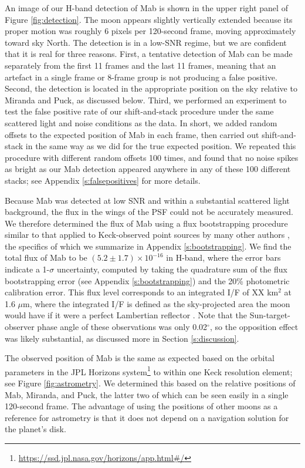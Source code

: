 \documentclass[preprint]{aastex631}
\begin{document}
An image of our H-band detection of Mab is shown in the upper right panel of Figure \ref{fig:detection}. The moon appears slightly vertically extended because its proper motion was roughly 6 pixels per 120-second frame, moving approximately toward sky North. The detection is in a low-SNR regime, but we are confident that it is real for three reasons. First, a tentative detection of Mab can be made separately from the first 11 frames and the last 11 frames, meaning that an artefact in a single frame or 8-frame group is not producing a false positive. Second, the detection is located in the appropriate position on the sky relative to Miranda and Puck, as discussed below. Third, we performed an experiment to test the false positive rate of our shift-and-stack procedure under the same scattered light and noise conditions as the data. In short, we added random offsets to the expected position of Mab in each frame, then carried out shift-and-stack in the same way as we did for the true expected position. We repeated this procedure with different random offsets 100 times, and found that no noise spikes as bright as our Mab detection appeared anywhere in any of these 100 different stacks; see Appendix \ref{s:falsepositives} for more details.

Because Mab was detected at low SNR and within a substantial scattered light background, the flux in the wings of the PSF could not be accurately measured. We therefore determined the flux of Mab using a flux bootstrapping procedure similar to that applied to Keck-observed point sources by many other authors \citep[e.g.,][]{gibbard05, molter19, paradis23}, the specifics of which we summarize in Appendix \ref{s:bootstrapping}. We find the total flux of Mab to be $(5.2 \pm 1.7)\times10^{-16}$ \ergsec in H-band, where the error bars indicate a 1-$\sigma$ uncertainty, computed by taking the quadrature sum of the flux bootstrapping error (see Appendix \ref{s:bootstrapping}) and the 20\% photometric calibration error. This flux level corresponds to an integrated I/F of XX km$^2$ at 1.6 $\mu$m, where the integrated I/F is defined as the sky-projected area the moon would have if it were a perfect Lambertian reflector \citep[i.e., a geometric albedo of unity][]{karkoschka01}. Note that the Sun-target-observer phase angle of these observations was only 0.02$^\circ$, so the opposition effect was likely substantial, as discussed more in Section \ref{s:discussion}. 

The observed position of Mab is the same as expected based on the orbital parameters in the JPL Horizons system\footnote{\url{https://ssd.jpl.nasa.gov/horizons/app.html\#/}} to within one Keck resolution element; see Figure \ref{fig:astrometry}. We determined this based on the relative positions of Mab, Miranda, and Puck, the latter two of which can be seen easily in a single 120-second frame. The advantage of using the positions of other moons as a reference for astrometry is that it does not depend on a navigation solution for the planet's disk.
\end{document}
